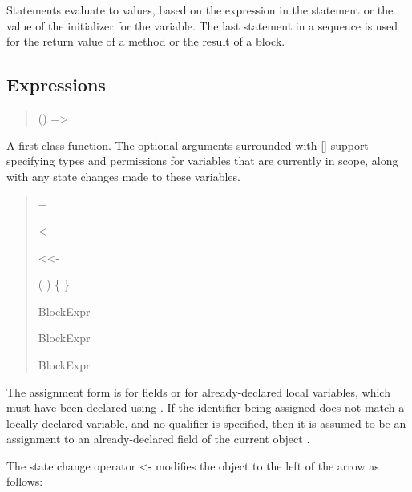 Statements evaluate to values, based on the expression in the
statement or the value of the initializer for the variable.  The last
statement in a sequence is used for the return value of a method or
the result of a block.

\subsection{Expressions}

\begin{quote}



 {}   ()
              => 

 {}

\end{quote}

A first-class function.  The optional arguments surrounded with
  [] support specifying types and permissions for variables that are
  currently in scope, along with any state changes made to these
  variables.

\begin{quote}


 {}  = 

 {} <- 

 {} <<- 

 {} (  ) \{  \}

 {}   BlockExpr

 {}   BlockExpr

 {} BlockExpr

 {}

\end{quote}

The assignment form is for fields or for already-declared local
variables, which must have been declared using .  If the
identifier being assigned does not match a locally declared variable,
and no qualifier is specified, then it is assumed to be an assignment
to an already-declared field of the current object .

The state change operator <- modifies the object to the left of the
arrow as follows:

